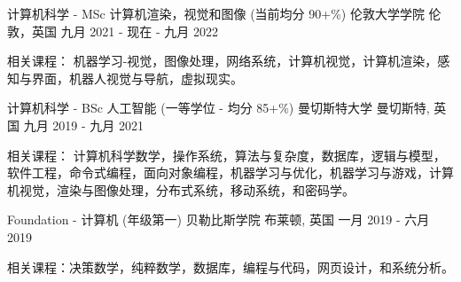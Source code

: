 

\begin{cventries}

  \cventry
    {计算机科学 - MSc 计算机渲染，视觉和图像 (当前均分 90+\%)} %
    {伦敦大学学院} %
    {伦敦，英国} %
    {九月 2021 - 现在 - 九月 2022} %
    {
      \begin{cvitems} %
        \item {相关课程： 机器学习-视觉，图像处理，网络系统，计算机视觉，计算机渲染，感知与界面，机器人视觉与导航，虚拟现实。}
      \end{cvitems}
    }
    
  \cventry
    {计算机科学 - BSc 人工智能 (一等学位 - 均分 85+\%)} %
    {曼切斯特大学} %
    {曼切斯特, 英国} %
    {九月 2019 - 九月 2021} %
    {
      \begin{cvitems} %
        \item {相关课程： 计算机科学数学，操作系统，算法与复杂度，数据库，逻辑与模型，软件工程，命令式编程，面向对象编程，机器学习与优化，机器学习与游戏，计算机视觉，渲染与图像处理，分布式系统，移动系统，和密码学。}
      \end{cvitems}
    }
    
    \cventry
    {Foundation - 计算机 (年级第一)} %
    {贝勒比斯学院} %
    {布莱顿, 英国} %
    {一月 2019 - 六月 2019} %
    {
     \begin{cvitems} %
        \item {相关课程：决策数学，纯粹数学，数据库，编程与代码，网页设计，和系统分析。}
      \end{cvitems}
    }
    

\end{cventries}
